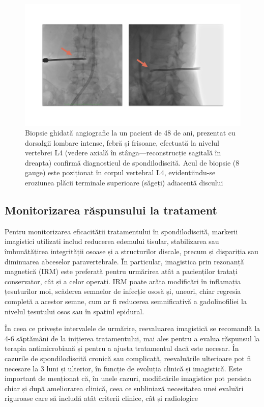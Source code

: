 \documentclass[romanian,12pt,a4paper]{article}
\begin{document}
\begin{figure}
\centering
\includegraphics[width=\textwidth]{Files/biop-48.png}
\caption{Biopsie ghidată angiografic la un pacient de 48 de ani,
prezentat cu dorsalgii lombare intense, febră și frisoane, efectuată la
nivelul vertebrei L4 (vedere axială în stânga---reconstrucție sagitală
în dreapta) confirmă diagnosticul de spondilodiscită. Acul de biopsie (8
gauge) este poziționat în corpul vertebral L4, evidențiindu-se eroziunea
plăcii terminale superioare (săgeți) adiacentă discului}
\end{figure}

\label{biop-48}{}

\subsection{Monitorizarea răspunsului la tratament}

Pentru monitorizarea eficacității tratamentului în spondilodiscită,
markerii imagistici utilizati includ reducerea edemului tisular,
stabilizarea sau îmbunătățirea integrității osoase și a structurilor
discale, precum și dispariția sau diminuarea abceselor paravertebrale.
În particular, imagistica prin rezonanță magnetică (IRM) este preferată
pentru urmărirea atât a pacienților tratați conservator, cât și a celor
operați. IRM poate arăta modificări în inflamația țesuturilor moi,
scăderea semnelor de infecție ososă și, uneori, chiar regresia completă
a acestor semne, cum ar fi reducerea semnificativă a gadolinofiliei la
nivelul țesutului osos sau în spațiul epidural.
\cite{CorrelationFollowupMRI2020}\cite{SpondylodiscitisUpdateDiagnosis2010}

În ceea ce privește intervalele de urmărire, reevaluarea imagistică se
recomandă la 4-6 săptămâni de la inițierea tratamentului, mai ales
pentru a evalua răspunsul la terapia antimicrobiană și pentru a ajusta
tratamentul dacă este necesar. În cazurile de spondilodiscită cronică
sau complicată, reevaluările ulterioare pot fi necesare la 3 luni și
ulterior, în funcție de evoluția clinică și imagistică. Este important
de menționat că, în unele cazuri, modificările imagistice pot persista
chiar și după ameliorarea clinică, ceea ce subliniază necesitatea unei
evaluări riguroase care să includă atât criterii clinice, cât și
radiologice
\cite{CorrelationFollowupMRI2020}\cite{ImagingAssessmentSpine2024}
\end{document}
